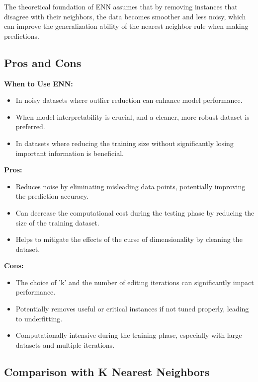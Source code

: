 \documentclass[12pt]{article}
\begin{document}
The theoretical foundation of ENN assumes that by removing instances that disagree with their neighbors, the data becomes smoother and less noisy, which can improve the generalization ability of the nearest neighbor rule when making predictions.

\subsection{Pros and Cons}

\textbf{When to Use ENN:}
\begin{itemize}
    \item In noisy datasets where outlier reduction can enhance model performance.
    \item When model interpretability is crucial, and a cleaner, more robust dataset is preferred.
    \item In datasets where reducing the training size without significantly losing important information is beneficial.
\end{itemize}

\textbf{Pros:}
\begin{itemize}
    \item Reduces noise by eliminating misleading data points, potentially improving the prediction accuracy.
    \item Can decrease the computational cost during the testing phase by reducing the size of the training dataset.
    \item Helps to mitigate the effects of the curse of dimensionality by cleaning the dataset.
\end{itemize}

\textbf{Cons:}
\begin{itemize}
    \item The choice of 'k' and the number of editing iterations can significantly impact performance.
    \item Potentially removes useful or critical instances if not tuned properly, leading to underfitting.
    \item Computationally intensive during the training phase, especially with large datasets and multiple iterations.
\end{itemize}

\subsection{Comparison with K Nearest Neighbors}
\end{document}
